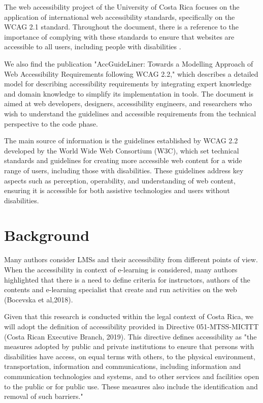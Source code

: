 \documentclass{IEEEtran}
\begin{document}
The web accessibility project of the University of Costa Rica focuses on the application of international web accessibility standards, specifically on the WCAG 2.1 standard. Throughout the document, there is a reference to the importance of complying with these standards to ensure that websites are accessible to all users, including people with disabilities \cite{DaSilva}.

We also find the publication "AccGuideLiner: Towards a Modelling Approach of Web Accessibility Requirements following WCAG 2.2," which describes a detailed model for describing accessibility requirements by integrating expert knowledge and domain knowledge to simplify its implementation in tools. The document is aimed at web developers, designers, accessibility engineers, and researchers who wish to understand the guidelines and accessible requirements from the technical perspective to the code phase.

The main source of information is the guidelines established by WCAG 2.2 developed by the World Wide Web Consortium (W3C), which set technical standards and guidelines for creating more accessible web content for a wide range of users, including those with disabilities. These guidelines address key aspects such as perception, operability, and understanding of web content, ensuring it is accessible for both assistive technologies and users without disabilities.



\section{Background}
Many authors consider LMSs and their accessibility from different points of view. When the accessibility in context of e-learning is considered, many authors highlighted that there is a need to define criteria for instructors, authors of the contents and e-learning specialist that create and run activities on the web (Bocevska et al,2018).

Given that this research is conducted within the legal context of Costa Rica, we will adopt the definition of accessibility provided in Directive 051-MTSS-MICITT (Costa Rican Executive Branch, 2019). This directive defines accessibility as "the measures adopted by public and private institutions to ensure that persons with disabilities have access, on equal terms with others, to the physical environment, transportation, information and communications, including information and communication technologies and systems, and to other services and facilities open to the public or for public use. These measures also include the identification and removal of such barriers."
\end{document}
